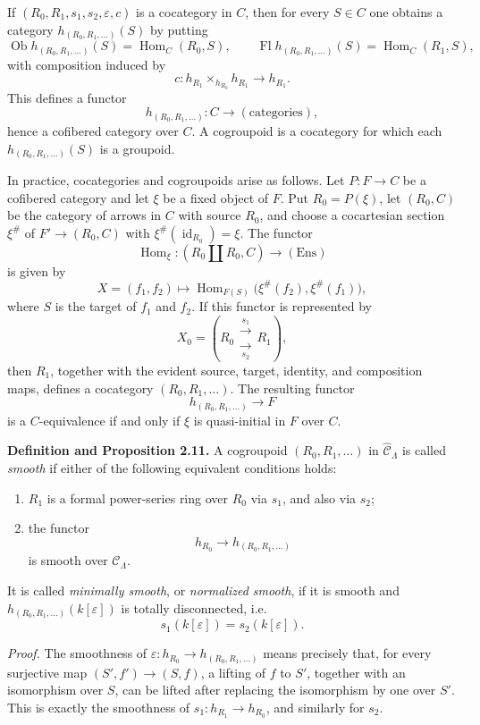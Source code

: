 \documentclass[11pt]{article}
\providecommand{\Hom}{\operatorname{Hom}}
\begin{document}
If \((R_0,R_1,s_1,s_2,\varepsilon,c)\) is a cocategory in \(C\), then for every
\(S\in C\) one obtains a category \(h_{(R_0,R_1,\ldots)}(S)\) by putting
\[
 \operatorname{Ob}h_{(R_0,R_1,\ldots)}(S)=\Hom_C(R_0,S),\qquad
 \operatorname{Fl}h_{(R_0,R_1,\ldots)}(S)=\Hom_C(R_1,S),
\]
with composition induced by
\[
 c:h_{R_1}\times_{h_{R_0}}h_{R_1}\longrightarrow h_{R_1}.
\]
This defines a functor
\[
 h_{(R_0,R_1,\ldots)}:C\longrightarrow(\mathrm{categories}),
\]
hence a cofibered category over \(C\). A cogroupoid is a cocategory for which each
\(h_{(R_0,R_1,\ldots)}(S)\) is a groupoid.

In practice, cocategories and cogroupoids arise as follows. Let \(P:F\to C\) be a cofibered
category and let \(\xi\) be a fixed object of \(F\). Put \(R_0=P(\xi)\), let \((R_0,C)\)
be the category of arrows in \(C\) with source \(R_0\), and choose a cocartesian section
\(\xi^\#\) of \(F'\to(R_0,C)\) with \(\xi^\#(\operatorname{id}_{R_0})=\xi\). The functor
\[
 \Hom_\xi:(R_0\amalg R_0,C)\longrightarrow(\mathrm{Ens})
\]
is given by
\[
 X=(f_1,f_2)\longmapsto
 \Hom_{F(S)}\bigl(\xi^\#(f_2),\xi^\#(f_1)\bigr),
\]
where \(S\) is the target of \(f_1\) and \(f_2\). If this functor is represented by
\[
 X_0=(R_0 \mathrel{\substack{\xrightarrow{s_1}\\[-.6ex]\xrightarrow[s_2]{}}} R_1),
\]
then \(R_1\), together with the evident source, target, identity, and composition maps, defines
a cocategory \((R_0,R_1,\ldots)\). The resulting functor
\[
 h_{(R_0,R_1,\ldots)}\longrightarrow F
\]
is a \(C\)-equivalence if and only if \(\xi\) is quasi-initial in \(F\) over \(C\).

\textbf{Definition and Proposition 2.11.} A cogroupoid
\((R_0,R_1,\ldots)\) in \(\widehat{\mathcal C}_\Lambda\) is called \emph{smooth} if either of
the following equivalent conditions holds:
\begin{enumerate}[label=(\roman*)]
\item \(R_1\) is a formal power-series ring over \(R_0\) via \(s_1\), and also via \(s_2\);
\item the functor
\[
 h_{R_0}\longrightarrow h_{(R_0,R_1,\ldots)}
\]
is smooth over \(\mathcal C_\Lambda\).
\end{enumerate}
It is called \emph{minimally smooth}, or \emph{normalized smooth}, if it is smooth and
\(h_{(R_0,R_1,\ldots)}(k[\varepsilon])\) is totally disconnected, i.e.
\[
 s_1(k[\varepsilon])=s_2(k[\varepsilon]).
\]

\emph{Proof.} The smoothness of
\(\varepsilon:h_{R_0}\to h_{(R_0,R_1,\ldots)}\) means precisely that, for every surjective map
\((S',f')\to(S,f)\), a lifting of \(f\) to \(S'\), together with an isomorphism over \(S\),
can be lifted after replacing the isomorphism by one over \(S'\). This is exactly the smoothness
of \(s_1:h_{R_1}\to h_{R_0}\), and similarly for \(s_2\).
\end{document}

